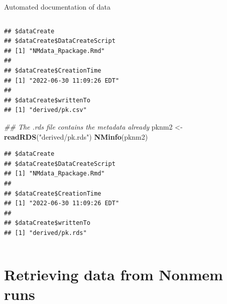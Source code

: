 \documentclass[
  8pt,
  ignorenonframetext,
  aspectratio=169]{beamer}
\newenvironment{Shaded}{\begin{snugshade}}{\end{snugshade}}
\newcommand{\CommentTok}[1]{\textcolor[rgb]{0.56,0.35,0.01}{\textit{#1}}}
\newcommand{\KeywordTok}[1]{\textcolor[rgb]{0.13,0.29,0.53}{\textbf{#1}}}
\newcommand{\NormalTok}[1]{#1}
\newcommand{\StringTok}[1]{\textcolor[rgb]{0.31,0.60,0.02}{#1}}
\begin{document}
\begin{frame}[fragile]{Automated documentation of data}
\begin{columns}[T]
\begin{column}{0.48\textwidth}
\begin{verbatim}
## $dataCreate
## $dataCreate$DataCreateScript
## [1] "NMdata_Rpackage.Rmd"
## 
## $dataCreate$CreationTime
## [1] "2022-06-30 11:09:26 EDT"
## 
## $dataCreate$writtenTo
## [1] "derived/pk.csv"
\end{verbatim}

\begin{Shaded}
\begin{Highlighting}[]
\CommentTok{\#\# The .rds file contains the metadata already}
\NormalTok{pknm2 \textless{}{-}}\StringTok{ }\KeywordTok{readRDS}\NormalTok{(}\StringTok{"derived/pk.rds"}\NormalTok{)}
\KeywordTok{NMinfo}\NormalTok{(pknm2)}
\end{Highlighting}
\end{Shaded}

\begin{verbatim}
## $dataCreate
## $dataCreate$DataCreateScript
## [1] "NMdata_Rpackage.Rmd"
## 
## $dataCreate$CreationTime
## [1] "2022-06-30 11:09:26 EDT"
## 
## $dataCreate$writtenTo
## [1] "derived/pk.rds"
\end{verbatim}
\end{column}
\end{columns}

\normalsize
\end{frame}

\hypertarget{retrieving-data-from-nonmem-runs}{%
\section{Retrieving data from Nonmem
runs}\label{retrieving-data-from-nonmem-runs}}
\end{document}
